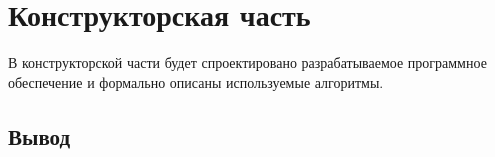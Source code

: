 \chapter{Конструкторская часть}
В конструкторской части будет спроектировано разрабатываемое программное обеспечение и формально описаны используемые алгоритмы.

\section*{Вывод}
